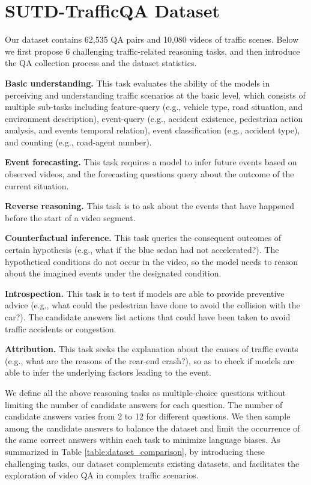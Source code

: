 \documentclass[final]{cvpr}
\begin{document}
\section{SUTD-TrafficQA Dataset}\label{section:dataset}

Our dataset contains 62,535 QA pairs and 10,080 videos of traffic scenes. Below we first propose 6 challenging traffic-related reasoning tasks, and then introduce the QA collection process and the dataset statistics. 

{\bf Basic understanding.} This task evaluates the ability of the models in perceiving and understanding traffic scenarios at the basic level, which consists of multiple sub-tasks including feature-query (e.g., vehicle type, road situation, and environment description), event-query (e.g., accident existence, pedestrian action analysis, and events temporal relation), event classification (e.g., accident type), and counting (e.g., road-agent number). 

{\bf Event forecasting.} This task requires a model to infer future events based on observed videos, and the forecasting questions query about the outcome of the current situation. 

{\bf Reverse reasoning.} This task is to ask about the events that have happened before the start of a video segment.


{\bf Counterfactual inference.} This task queries the consequent outcomes of certain hypothesis (e.g., what if the blue sedan had not accelerated?). The hypothetical conditions do not occur in the video, so the model needs to reason about the imagined events under the designated condition.

{\bf Introspection.} This task is to test if models are able to provide preventive advice (e.g., what could the pedestrian have done to avoid the collision with the car?). 
The candidate answers list actions that could have been taken to avoid traffic accidents or congestion.

{\bf Attribution.} This task seeks the explanation about the causes of traffic events (e.g., what are the reasons of the rear-end crash?), so as to check if models are able to infer the underlying factors leading to the event. 

We define all the above reasoning tasks as multiple-choice questions without limiting the number of candidate answers for each question. The number of candidate answers varies from 2 to 12 for different questions. We then sample among the candidate answers to balance the dataset and limit the occurrence of the same correct answers within each task to minimize language biases. As summarized in Table \ref{table:dataset_comparison}, by introducing these challenging tasks, our dataset complements existing datasets, and facilitates the exploration of video QA in complex traffic scenarios.
\end{document}
